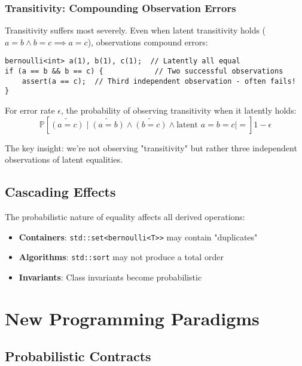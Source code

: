 \documentclass[11pt,final,hidelinks]{article}
\newcommand{\obs}[1]{\widetilde{#1}}  %
\newcommand{\ProbCond}[2]{\mathbb{P}\left[#1 \mid #2\right]}
\newcommand{\code}[1]{\texttt{#1}}
\begin{document}
\subsubsection{Transitivity: Compounding Observation Errors}

Transitivity suffers most severely. Even when latent transitivity holds ($a = b \land b = c \implies a = c$), observations compound errors:

\begin{verbatim}
bernoulli<int> a(1), b(1), c(1);  // Latently all equal
if (a == b && b == c) {            // Two successful observations
    assert(a == c);  // Third independent observation - often fails!
}
\end{verbatim}

For error rate $\epsilon$, the probability of observing transitivity when it latently holds:
\begin{equation}
\ProbCond{\obs{(a = c)} \mid \obs{(a = b)} \land \obs{(b = c)} \land \text{latent } a = b = c} = 1 - \epsilon
\end{equation}

The key insight: we're not observing "transitivity" but rather three independent observations of latent equalities.

\subsection{Cascading Effects}

The probabilistic nature of equality affects all derived operations:

\begin{itemize}
    \item \textbf{Containers}: \code{std::set<bernoulli<T>>} may contain "duplicates"
    \item \textbf{Algorithms}: \code{std::sort} may not produce a total order
    \item \textbf{Invariants}: Class invariants become probabilistic
\end{itemize}

\section{New Programming Paradigms}

\subsection{Probabilistic Contracts}
\end{document}
